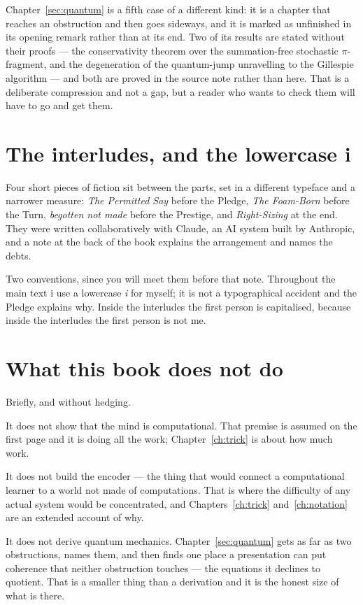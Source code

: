 \noindent
Chapter~\ref{sec:quantum} is a fifth case of a different kind: it
is a chapter that reaches an obstruction and then goes sideways,
and it is marked as unfinished in its opening remark rather than at
its end.
Two of its results are stated without their proofs --- the
conservativity theorem over the summation-free stochastic
$\pi$-fragment, and the degeneration of the quantum-jump
unravelling to the Gillespie algorithm --- and both are proved in
the source note rather than here.
That is a deliberate compression and not a gap, but a reader who
wants to check them will have to go and get them.

\section*{The interludes, and the lowercase i}

Four short pieces of fiction sit between the parts, set in a
different typeface and a narrower measure: \emph{The Permitted Say}
before the Pledge, \emph{The Foam-Born} before the Turn,
\emph{begotten not made} before the Prestige, and
\emph{Right-Sizing} at the end.
They were written collaboratively with Claude, an AI system built
by Anthropic, and a note at the back of the book explains the
arrangement and names the debts.

Two conventions, since you will meet them before that note.
Throughout the main text i use a lowercase \emph{i} for myself; it
is not a typographical accident and the Pledge explains why.
Inside the interludes the first person is capitalised, because
inside the interludes the first person is not me.

\section*{What this book does not do}

Briefly, and without hedging.

It does not show that the mind is computational.
That premise is assumed on the first page and it is doing all the
work; Chapter~\ref{ch:trick} is about how much work.

It does not build the encoder --- the thing that would connect a
computational learner to a world not made of computations.
That is where the difficulty of any actual system would be
concentrated, and Chapters~\ref{ch:trick}
and~\ref{ch:notation} are an extended account of why.

It does not derive quantum mechanics.
Chapter~\ref{sec:quantum} gets as far as two obstructions, names
them, and then finds one place a presentation can put coherence
that neither obstruction touches --- the equations it declines to
quotient.
That is a smaller thing than a derivation and it is the honest size
of what is there.

